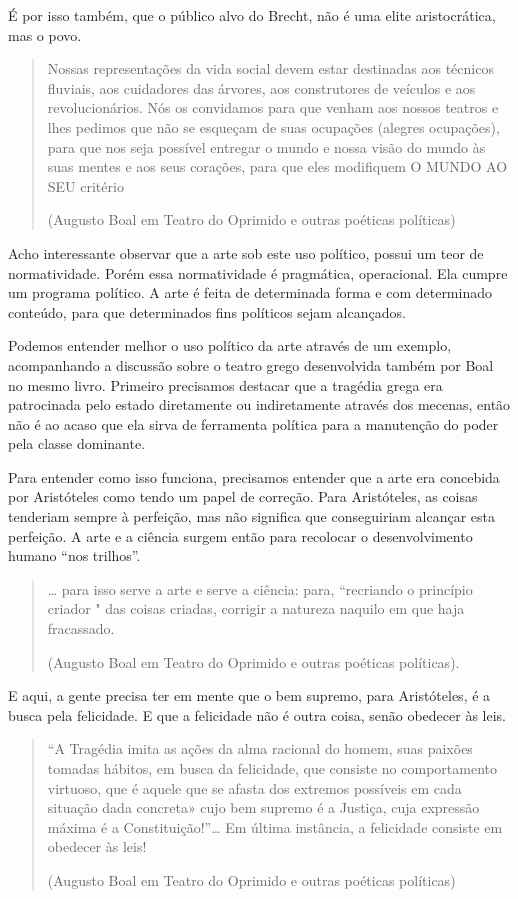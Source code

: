 É por isso também, que o público alvo do Brecht, não é uma elite aristocrática, mas o povo.

\begin{quote}
Nossas representações da vida social devem estar destinadas aos técnicos fluviais, aos cuidadores das árvores, aos construtores de veículos e aos revolucionários. Nós os convidamos para que venham aos nossos teatros e lhes pedimos que não se esqueçam de suas ocupações (alegres ocupações), para que nos seja possível entregar o mundo e nossa visão do mundo às suas mentes e aos seus corações, para que eles modifiquem O MUNDO AO SEU critério

(Augusto Boal em Teatro do Oprimido e outras poéticas políticas)
\end{quote}

Acho interessante observar que a arte sob este uso político, possui um teor de normatividade. Porém essa normatividade é pragmática, operacional. Ela cumpre um programa político. A arte é feita de determinada forma e com determinado conteúdo, para que determinados fins políticos sejam alcançados.

Podemos entender melhor o uso político da arte através de um exemplo, acompanhando a discussão sobre o teatro grego desenvolvida também por Boal no mesmo livro. Primeiro precisamos destacar que a tragédia grega era patrocinada pelo estado diretamente ou indiretamente através dos mecenas, então não é ao acaso que ela sirva de ferramenta política para a manutenção do poder pela classe dominante.

Para entender como isso funciona, precisamos entender que a arte era concebida por Aristóteles como tendo um papel de correção. Para Aristóteles, as coisas tenderiam sempre à perfeição, mas não significa que conseguiriam alcançar esta perfeição. A arte e a ciência surgem então para recolocar o desenvolvimento humano “nos trilhos”.

\begin{quote}
… para isso serve a arte e serve a ciência: para, “recriando o princípio criador " das coisas criadas, corrigir a natureza naquilo em que haja fracassado.

(Augusto Boal em Teatro do Oprimido e outras poéticas políticas).
\end{quote}

E aqui, a gente precisa ter em mente que o bem supremo, para Aristóteles, é a busca pela felicidade. E que a felicidade não é outra coisa, senão obedecer às leis.

\begin{quote}
“A Tragédia imita as ações da alma racional do homem, suas paixões tomadas hábitos, em busca da felicidade, que consiste no comportamento virtuoso, que é aquele que se afasta dos extremos possíveis em cada situação dada concreta» cujo bem supremo é a Justiça, cuja expressão máxima é a Constituição!”… Em última instância, a felicidade consiste em obedecer às leis!

(Augusto Boal em Teatro do Oprimido e outras poéticas políticas)
\end{quote}

